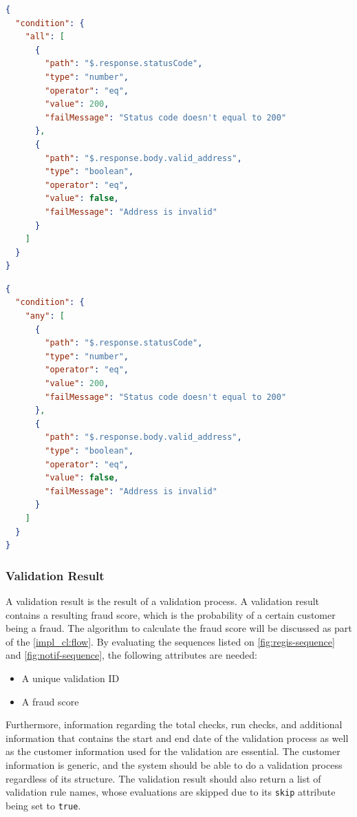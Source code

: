     \begin{lstlisting}[caption={Validation rule \textbf{condition} attribute example with ALL condition (JSON)}, language=json]
{
  "condition": {
    "all": [
      {
        "path": "$.response.statusCode",
        "type": "number",
        "operator": "eq",
        "value": 200,
        "failMessage": "Status code doesn't equal to 200"
      },
      {
        "path": "$.response.body.valid_address",
        "type": "boolean",
        "operator": "eq",
        "value": false,
        "failMessage": "Address is invalid"
      }
    ]
  }
}
\end{lstlisting}

    \newpage
    \begin{lstlisting}[caption={Validation rule \textbf{condition} attribute example with ANY condition (JSON)}, language=json]
{
  "condition": {
    "any": [
      {
        "path": "$.response.statusCode",
        "type": "number",
        "operator": "eq",
        "value": 200,
        "failMessage": "Status code doesn't equal to 200"
      },
      {
        "path": "$.response.body.valid_address",
        "type": "boolean",
        "operator": "eq",
        "value": false,
        "failMessage": "Address is invalid"
      }
    ]
  }
}
    \end{lstlisting}

  \subsubsection{Validation Result}

    A validation result is the result of a validation process. A validation result contains a resulting fraud score, which is the probability of a certain customer being a fraud. The algorithm to calculate the fraud score will be discussed as part of the \autoref{impl_cl:flow}.
    By evaluating the sequences listed on \autoref{fig:regis-sequence} and \autoref{fig:notif-sequence}, the following attributes are needed:

    \begin{itemize}
      \item A unique validation ID
      \item A fraud score 
    \end{itemize}

    Furthermore, information regarding the total checks, run checks, and additional information that contains the start and end date of the validation process as well as the customer information used for the validation are essential. The customer information is generic, and the system should be able to do a validation process regardless of its structure. The validation result should also return a list of validation rule names, whose evaluations are skipped due to its \verb;skip; attribute being set to \verb;true;.

